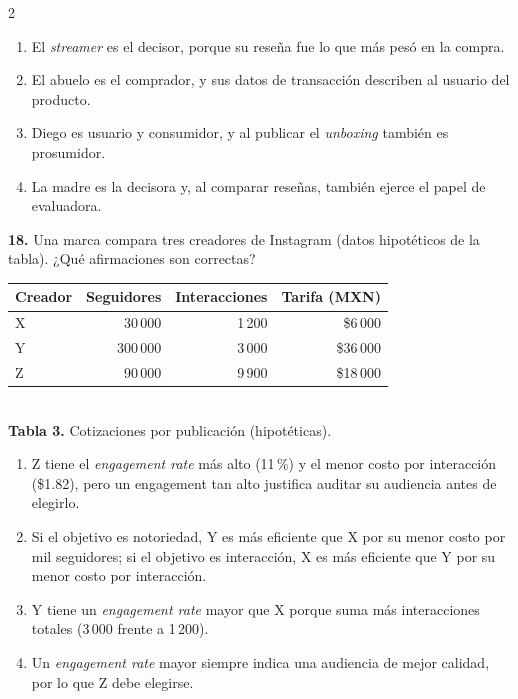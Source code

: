 \documentclass[10pt,letterpaper]{article}
\newcommand{\cas}{\framebox[1.0em]{\rule{0pt}{1.05ex}}}
\begin{document}
\begin{multicols}{2}
\begin{minipage}[t]{\columnwidth}
\begin{enumerate}[label=\cas\ \alph*),leftmargin=2.3em,itemsep=1.2pt,topsep=1pt,parsep=0pt,partopsep=0pt]
\item El \textit{streamer} es el decisor, porque su reseña fue lo que más pesó en la compra.
\item El abuelo es el comprador, y sus datos de transacción describen al usuario del producto.
\item Diego es usuario y consumidor, y al publicar el \textit{unboxing} también es prosumidor.
\item La madre es la decisora y, al comparar reseñas, también ejerce el papel de evaluadora.
\end{enumerate}\end{minipage}\par\vspace{3pt}
\begin{minipage}[t]{\columnwidth}\noindent\textbf{18.} Una marca compara tres creadores de Instagram (datos hipotéticos de la tabla). ¿Qué afirmaciones son correctas?
\begin{center}{\scriptsize\renewcommand{\arraystretch}{1.05}\begin{tabular}{@{}lrrr@{}}\toprule
Creador & Seguidores & Interacciones & Tarifa (MXN)\\\midrule
X & 30\,000 & 1\,200 & \$6\,000\\ Y & 300\,000 & 3\,000 & \$36\,000\\ Z & 90\,000 & 9\,900 & \$18\,000\\\bottomrule\end{tabular}}\\[1pt]{\tiny\textbf{Tabla 3.} Cotizaciones por publicación (hipotéticas).}\end{center}
\vspace{1pt}\begin{enumerate}[label=\cas\ \alph*),leftmargin=2.3em,itemsep=1.2pt,topsep=1pt,parsep=0pt,partopsep=0pt]
\item Z tiene el \textit{engagement rate} más alto (11\,\%) y el menor costo por interacción (\$1.82), pero un engagement tan alto justifica auditar su audiencia antes de elegirlo.
\item Si el objetivo es notoriedad, Y es más eficiente que X por su menor costo por mil seguidores; si el objetivo es interacción, X es más eficiente que Y por su menor costo por interacción.
\item Y tiene un \textit{engagement rate} mayor que X porque suma más interacciones totales (3\,000 frente a 1\,200).
\item Un \textit{engagement rate} mayor siempre indica una audiencia de mejor calidad, por lo que Z debe elegirse.

\end{enumerate}
\end{minipage}
\end{multicols}
\end{document}
